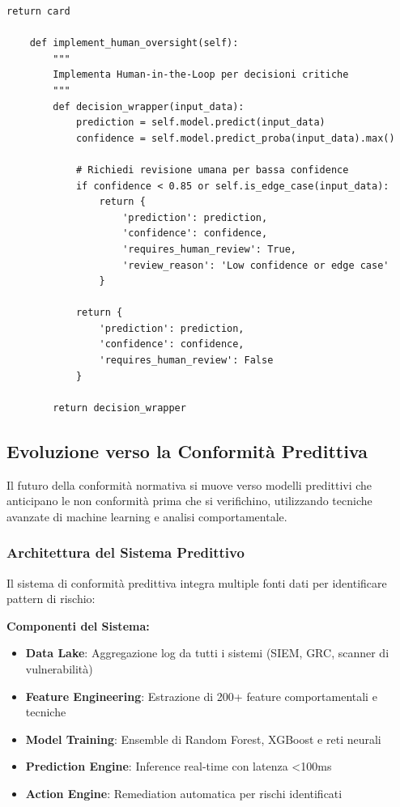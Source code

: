 \begin{lstlisting}[caption={Framework Python per AI Act Compliance},label={lst:ai_compliance}]
        return card
    
    def implement_human_oversight(self):
        """
        Implementa Human-in-the-Loop per decisioni critiche
        """
        def decision_wrapper(input_data):
            prediction = self.model.predict(input_data)
            confidence = self.model.predict_proba(input_data).max()
            
            # Richiedi revisione umana per bassa confidence
            if confidence < 0.85 or self.is_edge_case(input_data):
                return {
                    'prediction': prediction,
                    'confidence': confidence,
                    'requires_human_review': True,
                    'review_reason': 'Low confidence or edge case'
                }
            
            return {
                'prediction': prediction,
                'confidence': confidence,
                'requires_human_review': False
            }
        
        return decision_wrapper
\end{lstlisting}

\subsection{\texorpdfstring{Evoluzione verso la Conformità Predittiva}{4.8.2 - Evoluzione verso la Conformità Predittiva}}

Il futuro della conformità normativa si muove verso modelli predittivi che anticipano le non conformità prima che si verifichino, utilizzando tecniche avanzate di machine learning e analisi comportamentale.

\subsubsection{\texorpdfstring{Architettura del Sistema Predittivo}{4.8.2.1 - Architettura del Sistema Predittivo}}

Il sistema di conformità predittiva integra multiple fonti dati per identificare pattern di rischio:

\textbf{Componenti del Sistema:}
\begin{itemize}
    \item \textbf{Data Lake}: Aggregazione log da tutti i sistemi (SIEM, GRC, scanner di vulnerabilità)
    \item \textbf{Feature Engineering}: Estrazione di 200+ feature comportamentali e tecniche
    \item \textbf{Model Training}: Ensemble di Random Forest, XGBoost e reti neurali
    \item \textbf{Prediction Engine}: Inference real-time con latenza <100ms
    \item \textbf{Action Engine}: Remediation automatica per rischi identificati
\end{itemize}

